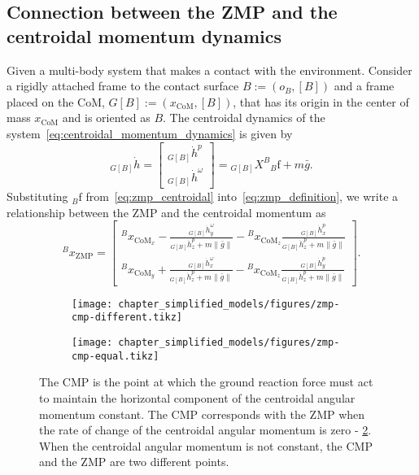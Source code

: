 \subsection{Connection between the ZMP and the centroidal momentum dynamics}
Given a multi-body system that makes a contact with the environment. Consider a rigidly attached frame to the contact surface $B:=(o_B, [B])$ and a frame placed on the CoM, $G[B]:=(x_\text{CoM}, [B])$, that has its origin in the center of mass $x_\text{CoM}$ and is oriented as $B$. The centroidal dynamics of the system~\eqref{eq:centroidal_momentum_dynamics} is given by
\begin{equation}
\label{eq:zmp_centroidal}
    {}_{G[B]} \dot{h} =  \begin{bmatrix}
     {}_{G[B]} \dot{h}^p \\
      {}_{G[B]} \dot{h}^\omega
    \end{bmatrix} = {}_{G[B]} X ^ B {}_B \mathrm{f} + m \bar{g}.
\end{equation}
Substituting ${}_B\mathrm{f}$ from~\eqref{eq:zmp_centroidal} into~\eqref{eq:zmp_definition}, we write a relationship between the ZMP and the centroidal momentum as
\begin{equation}
    \label{eq:zmp_centroidal_relationship}
    {}^B x_\text{ZMP} = \begin{bmatrix}
    {}^B x_{\text{CoM}_x} - \frac{ {}_{G[B]} \dot{h}^\omega_y}{ {}_{G[B]} \dot{h}^p_z + m \| \bar{g} \|} - {}^B  x_{\text{CoM}_z} \frac{ {}_{G[B]} \dot{h}^p_x}{{}_{G[B]} \dot{h}^p_z + m \| \bar{g} \|} \\
    {}^B  x_{\text{CoM}_y} + \frac{ {}_{G[B]} \dot{h}^\omega_x}{ {}_{G[B]} \dot{h}^p_z + m \| \bar{g} \|} - {}^B  x_{\text{CoM}_z} \frac{ {}_{G[B]} \dot{h}_y^p}{{}_{G[B]} \dot{h}_z^p + m \| \bar{g} \|}
    \end{bmatrix}.
\end{equation}
\begin{figure}[t]
\centering
    \begin{subfigure}[b]{0.48\textwidth}
        \centering
        \texttt{[image: chapter\_simplified\_models/figures/zmp-cmp-different.tikz]}
        \caption{}
        \label{fig:zmp-cmp-different}
    \end{subfigure}
    \hfill
    \begin{subfigure}[b]{0.48\textwidth}
        \centering
        \texttt{[image: chapter\_simplified\_models/figures/zmp-cmp-equal.tikz]}
        \caption{}
        \label{fig:zmp-cmp-equal}
    \end{subfigure}
	\caption[Relation between CMP and ZMP.]{The CMP is the point at which the ground reaction force must act to maintain the horizontal component of the centroidal angular momentum constant. The CMP corresponds with the ZMP when the rate of change of the centroidal angular momentum is zero - \ref{fig:zmp-cmp-equal}. When the centroidal angular momentum is not constant, the CMP and the ZMP are two different points.}
	\label{fig:cmp-zmp}
\end{figure}
